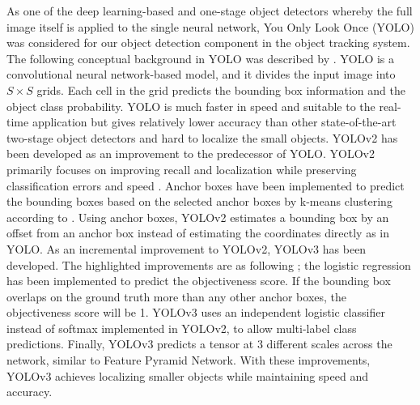 As one of the deep learning-based and one-stage object detectors whereby the full image itself is applied to the single neural network, You Only Look Once (YOLO) was considered for our object detection component in the object tracking system. The following conceptual background in YOLO was described by \citeauthor{redmon_you_2016} \cite{redmon_you_2016}. YOLO is a convolutional neural network-based model, and it divides the input image into $S \times S$ grids. Each cell in the grid predicts the bounding box information and the object class probability. YOLO is much faster in speed and suitable to the real-time application but gives relatively lower accuracy than other state-of-the-art two-stage object detectors and hard to localize the small objects. YOLOv2 has been developed as an improvement to the predecessor of YOLO. YOLOv2 primarily focuses on improving recall and localization while preserving classification errors and speed \cite{redmon_yolo9000_2017}. Anchor boxes have been implemented to predict the bounding boxes based on the selected anchor boxes by k-means clustering according to \citeauthor{redmon_yolo9000_2017}. Using anchor boxes, YOLOv2 estimates a bounding box by an offset from an anchor box instead of estimating the coordinates directly as in YOLO. As an incremental improvement to YOLOv2, YOLOv3 has been developed. The highlighted improvements are as following \cite{redmon_yolov3_2018}; the logistic regression has been implemented to predict the objectiveness score. If the bounding box overlaps on the ground truth more than any other anchor boxes, the objectiveness score will be 1. YOLOv3 uses an independent logistic classifier instead of softmax implemented in YOLOv2, to allow multi-label class predictions. Finally, YOLOv3 predicts a tensor at 3 different scales across the network, similar to Feature Pyramid Network. With these improvements, YOLOv3 achieves localizing smaller objects while maintaining speed and accuracy.


